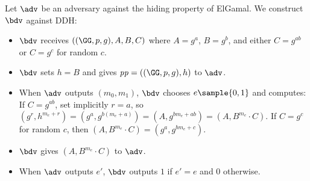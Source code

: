\ifsolutions
\begin{mysolution}
   Let $\adv$ be an adversary against the hiding property of ElGamal.
  We construct $\bdv$ against DDH:
  \begin{itemize}
    \item $\bdv$ receives $(\gparam, A, B, C)$ where $A = g^a$, $B = g^b$, and either $C = g^{ab}$ or $C = g^c$ for random $c$.
    \item $\bdv$ sets $h = B$ and gives $\params = (\gparam, h)$ to $\adv$.
    \item When $\adv$ outputs $(m_0, m_1)$, $\bdv$ chooses $e \sample \{0, 1\}$ and computes:
          If $C = g^{ab}$, set implicitly $r = a$, so $(g^r, h^{m_e + r}) = (g^a, g^{b(m_e + a)}) = (A, g^{bm_e + ab}) = (A, B^{m_e} \cdot C)$.
          If $C = g^c$ for random $c$, then $(A, B^{m_e} \cdot C) = (g^a, g^{bm_e + c})$.
    \item $\bdv$ gives $(A, B^{m_e} \cdot C)$ to $\adv$.
    \item When $\adv$ outputs $e'$, $\bdv$ outputs $1$ if $e' = e$ and $0$ otherwise.
  \end{itemize}


\end{mysolution}
